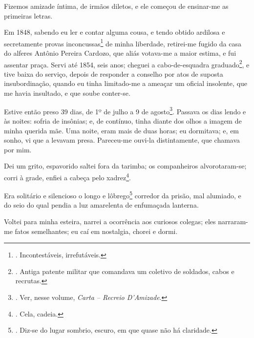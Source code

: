 Fizemos amizade íntima, de irmãos diletos, e ele começou de ensinar-me
as primeiras letras.

Em 1848, sabendo eu ler e contar alguma cousa, e tendo obtido ardilosa e
secretamente provas inconcussas\footnote{. Incontestáveis, irrefutáveis.}
de minha liberdade, retirei-me fugido da casa do alferes Antônio Pereira
Cardozo, que aliás votava-me a maior estima, e fui assentar praça. Servi
até 1854, seis anos; cheguei a cabo-de-esquadra graduado\footnote{.
  Antiga patente militar que comandava um coletivo de soldados, cabos e
  recrutas.}, e tive baixa do serviço, depois de responder a conselho
por atos de suposta insubordinação, quando eu tinha limitado-me a
ameaçar um oficial insolente, que me havia insultado, e que soube
conter-se.

Estive então preso 39 dias, de 1º de julho a 9 de agosto\footnote{. Ver,
  nesse volume, \emph{Carta -- Recreio D'Amizade}.}. Passava os dias
lendo e às noites: sofria de insônias; e, de contínuo, tinha diante dos
olhos a imagem de minha querida mãe. Uma noite, eram mais de duas horas;
eu dormitava; e, em sonho, vi que a levavam presa. Pareceu-me ouvi-la
distintamente, que chamava por mim.

Dei um grito, espavorido saltei fora da tarimba; os companheiros
alvorotaram-se; corri à grade, enfiei a cabeça pelo xadrez\footnote{.
  Cela, cadeia.}.

Era solitário e silencioso o longo e lôbrego\footnote{. Diz-se do lugar
  sombrio, escuro, em que quase não há claridade.} corredor da prisão,
mal alumiado, e do seio do qual pendia a luz amarelenta de enfumaçada
lanterna.

Voltei para minha esteira, narrei a ocorrência aos curiosos colegas;
eles narraram-me fatos semelhantes; eu caí em nostalgia, chorei e dormi.

